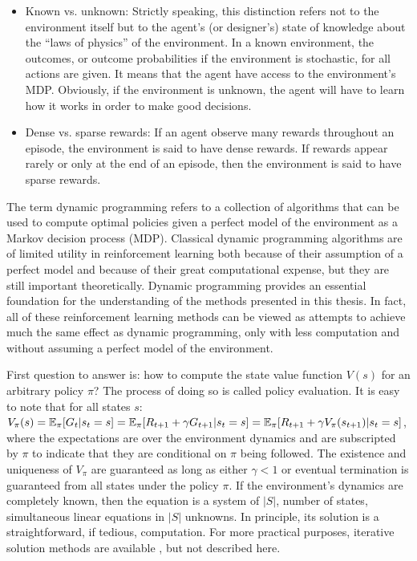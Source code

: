 \begin{itemize}
\item Known vs. unknown: Strictly speaking, this distinction refers not to the environment itself but to the agent’s (or designer’s) state of knowledge about the “laws of physics” of the environment. In a known environment, the outcomes, or outcome probabilities if the environment is stochastic, for all actions are given. It means that the agent have access to the environment's MDP. Obviously, if the environment is unknown, the agent will have to learn how it works in order to make good decisions.
\item Dense vs. sparse rewards: If an agent observe many rewards throughout an episode, the environment is said to have dense rewards. If rewards appear rarely or only at the end of an episode, then the environment is said to have sparse rewards.
\end{itemize}

The term dynamic programming refers to a collection of algorithms that can be used to compute optimal policies given a perfect model of the environment as a Markov decision process (MDP). Classical dynamic programming algorithms are of limited utility in reinforcement learning both because of their assumption of a perfect model and because of their great computational expense, but they are still important theoretically. Dynamic programming provides an essential foundation for the understanding of the methods presented in this thesis. In fact, all of these reinforcement learning methods can be viewed as attempts to achieve much the same effect as dynamic programming, only with less computation and without assuming a perfect model of the environment.

First question to answer is: how to compute the state value function $V(s)$ for an arbitrary policy $\pi$? The process of doing so is called policy evaluation. It is easy to note that for all states $s$: $V_\pi(s) = \operatorname{\mathbb{E}}_\pi[G_t | s_t = s] = \operatorname{\mathbb{E}}_\pi[R_{t+1} + \gamma G_{t+1} | s_t = s] = \operatorname{\mathbb{E}}_\pi[R_{t+1} + \gamma V_\pi(s_{t+1}) | s_t = s]$, where the expectations are over the environment dynamics and are subscripted by $\pi$ to indicate that they are conditional on $\pi$ being followed. The existence and uniqueness of $V_\pi$ are guaranteed as long as either $\gamma < 1$ or eventual termination is guaranteed from all states under the policy $\pi$. If the environment’s dynamics are completely known, then the equation is a system of $|S|$, number of states, simultaneous linear equations in $|S|$ unknowns. In principle, its solution is a straightforward, if tedious, computation. For more practical purposes, iterative solution methods are available \cite{Book.RLAI}, but not described here.

